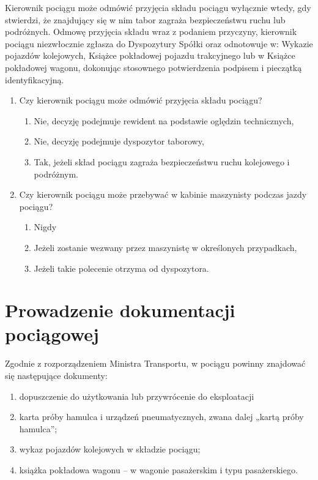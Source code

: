 Kierownik pociągu może odmówić przyjęcia składu pociągu wyłącznie wtedy, gdy stwierdzi, że znajdujący się w nim tabor zagraża bezpieczeństwu ruchu lub podróżnych. Odmowę przyjęcia składu wraz z podaniem przyczyny, kierownik pociągu niezwłocznie zgłasza do Dyspozytury Spółki oraz odnotowuje w:
Wykazie pojazdów kolejowych, Książce pokładowej pojazdu trakcyjnego lub w Książce pokładowej wagonu, dokonując stosownego potwierdzenia podpisem
i pieczątką identyfikacyjną.

\begin{tcolorbox}
	\begin{enumerate}
		\item Czy kierownik pociągu może odmówić przyjęcia składu pociągu?
		\begin{enumerate}
			\item Nie, decyzję podejmuje rewident na podstawie oględzin technicznych,
			\item Nie, decyzję podejmuje dyspozytor taborowy,
			\item Tak, jeżeli skład pociągu zagraża bezpieczeństwu ruchu kolejowego i podróżnym.
		\end{enumerate}
		\item Czy kierownik pociągu może przebywać w kabinie maszynisty podczas jazdy pociągu?
		\begin{enumerate}
			\item Nigdy
			\item Jeżeli zostanie wezwany przez maszynistę w określonych przypadkach,
			\item Jeżeli takie polecenie otrzyma od dyspozytora.
		\end{enumerate}
	\end{enumerate}
\end{tcolorbox}

\chapter{Prowadzenie dokumentacji pociągowej}

Zgodnie z rozporządzeniem Ministra Transportu, w pociągu powinny znajdować się następujące dokumenty:
\begin{enumerate}
	\item dopuszczenie do użytkowania lub przywrócenie do eksploatacji
	\item karta próby hamulca i urządzeń pneumatycznych, zwana dalej „kartą próby hamulca”;
	\item wykaz pojazdów kolejowych w składzie pociągu;
	\item książka pokładowa wagonu – w wagonie pasażerskim i typu pasażerskiego.
\end{enumerate}

